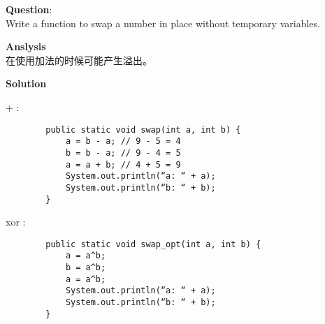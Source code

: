    
\begin{description}
    \item{\textbf{Question}}:\\%
		Write a function to swap a number in place without temporary variables.

    \item{\textbf{Anslysis}}\\
		在使用加法的时候可能产生溢出。

    \item{\textbf{Solution}}
	\item{+} : \\
		\begin{lstlisting}
		public static void swap(int a, int b) {
			a = b - a; // 9 - 5 = 4
			b = b - a; // 9 - 4 = 5
			a = a + b; // 4 + 5 = 9
			System.out.println(“a: “ + a);
			System.out.println(“b: “ + b);
		}
		\end{lstlisting}
	\item{xor} : \\
		\begin{lstlisting}
		public static void swap_opt(int a, int b) {
			a = a^b;
			b = a^b;
			a = a^b;
			System.out.println(“a: “ + a);
			System.out.println(“b: “ + b);
		}
		\end{lstlisting}

\end{description}

